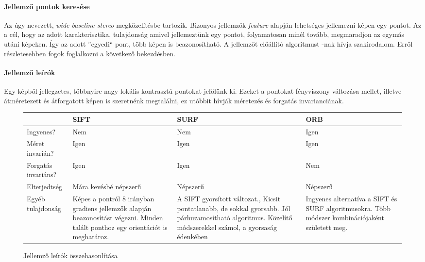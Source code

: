 \documentclass[12pt,a4paper,oneside]{report} %
\begin{document}
\paragraph{Jellemző pontok keresése}
Az úgy nevezett, \textit{wide baseline stereo} megközelítésbe tartozik.
Bizonyos jellemzők \textit{feature} alapján lehetséges jellemezni képen egy pontot. Az a cél, hogy az adott karakterisztika, tulajdonság amivel jellemeztünk egy pontot, folyamatosan minél tovább, megmaradjon az egymás utáni képeken. Így az adott ''egyedi`` pont, több képen is beazonosítható. A jellemzőt előállító algoritmust -nak hívja szakirodalom. Erről részletesebben fogok foglalkozni a következő bekezdésben.

\paragraph{Jellemző leírók}
Egy képből jellegzetes, többnyire nagy lokális kontrasztú pontokat jelölünk ki. Ezeket a pontokat fényviszony változása mellet, illetve átméretezett és átforgatott képen is szeretnénk megtalálni, ez utóbbit hívják méretezés és forgatás invarianciának.
\begin{figure}[H]
	\centering
	\begin{tabular}{s|p{3.5cm}|p{3.5cm}|p{3.5cm} }
		& SIFT \cite{lowe2004distinctive} & SURF \cite{bay2006surf} &  ORB \cite{rublee2011orb} \\
		\hline
		Ingyenes? & Nem & Nem & Igen \\
		Méret invarián? & Igen & Igen & Igen \\
		Forgatás invariáns? & Igen & Igen & Nem \\
		Elterjedtség & Mára kevésbé népszerű & Népszerű & Népszerű \\
		Egyéb tulajdonság 
		& Képes a pontról 8 irányban gradiens jellemzők alapján beazonosítást végezni.
		Minden talált ponthoz egy orientációt is meghatároz. 
		& A SIFT gyorsított változat., Kicsit pontatlanabb, de sokkal gyorsabb. Jól párhuzamosítható algoritmus. Közelítő módszerekkel számol, a gyorsaság édenkében 
		& Ingyenes alternatíva a SIFT és SURF algoritmusokra. Több módszer kombinációjaként született meg.\\
	
	\end{tabular}
	\caption{Jellemző leírók összehasonlítása}
\end{figure}
\end{document}
